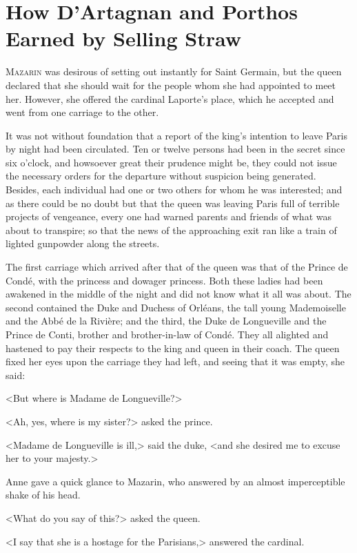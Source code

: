 \chapter{How D'Artagnan and Porthos Earned by Selling Straw}

 \lettrine{M}{azarin} was desirous of setting out instantly for Saint Germain, but the queen declared that she should wait for the people whom she had appointed to meet her. However, she offered the cardinal Laporte's place, which he accepted and went from one carriage to the other.

It was not without foundation that a report of the king's intention to leave Paris by night had been circulated. Ten or twelve persons had been in the secret since six o'clock, and howsoever great their prudence might be, they could not issue the necessary orders for the departure without suspicion being generated. Besides, each individual had one or two others for whom he was interested; and as there could be no doubt but that the queen was leaving Paris full of terrible projects of vengeance, every one had warned parents and friends of what was about to transpire; so that the news of the approaching exit ran like a train of lighted gunpowder along the streets.

The first carriage which arrived after that of the queen was that of the Prince de Condé, with the princess and dowager princess. Both these ladies had been awakened in the middle of the night and did not know what it all was about. The second contained the Duke and Duchess of Orléans, the tall young Mademoiselle and the Abbé de la Rivière; and the third, the Duke de Longueville and the Prince de Conti, brother and brother-in-law of Condé. They all alighted and hastened to pay their respects to the king and queen in their coach. The queen fixed her eyes upon the carriage they had left, and seeing that it was empty, she said:

<But where is Madame de Longueville?>

<Ah, yes, where is my sister?> asked the prince.

<Madame de Longueville is ill,> said the duke, <and she desired me to excuse her to your majesty.>

Anne gave a quick glance to Mazarin, who answered by an almost imperceptible shake of his head.

<What do you say of this?> asked the queen.

<I say that she is a hostage for the Parisians,> answered the cardinal.

